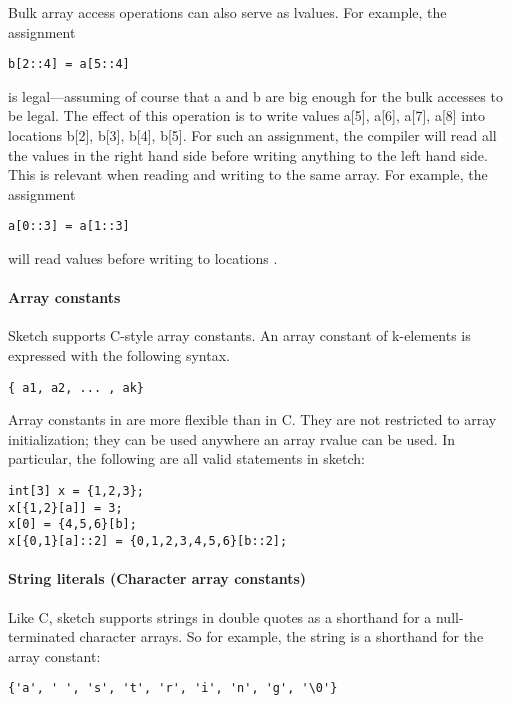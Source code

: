 Bulk array access operations can also serve as lvalues. For example, the assignment 
\begin{lstlisting}
b[2::4] = a[5::4] 
\end{lstlisting}
is legal---assuming of course that a and b are big enough for the bulk accesses to be legal. The effect of this operation is to write values a[5], a[6], a[7], a[8] into locations b[2], b[3], b[4], b[5]. For such an assignment, the compiler will read all the values in the right hand side before writing anything to the left hand side. This is relevant when reading and writing to the same array. For example, the assignment 
\begin{lstlisting}
a[0::3] = a[1::3] 
\end{lstlisting}
will read values   before writing to locations  .

\paragraph{Array constants}
Sketch supports C-style array constants. An array constant of k-elements is expressed with the following syntax.
\begin{lstlisting}
{ a1, a2, ... , ak}
\end{lstlisting}
Array constants in \Sk{} are more flexible than in C. They are not restricted to array initialization; they can be used anywhere an array rvalue can be used. In particular, the following are all valid statements in sketch:
\begin{lstlisting}
int[3] x = {1,2,3};
x[{1,2}[a]] = 3;
x[0] = {4,5,6}[b];
x[{0,1}[a]::2] = {0,1,2,3,4,5,6}[b::2];
\end{lstlisting}

\paragraph{String literals (Character array constants)}
Like C, sketch supports strings in double quotes as a shorthand for a null-terminated character arrays. So for example, the string  is a shorthand for the array constant:
\begin{lstlisting}
{'a', ' ', 's', 't', 'r', 'i', 'n', 'g', '\0'}
\end{lstlisting}



